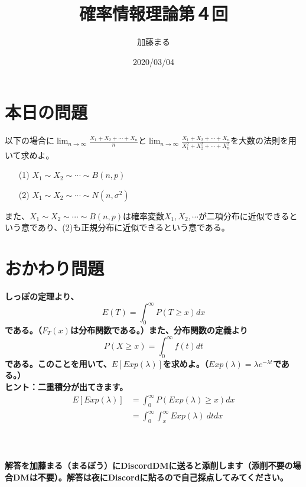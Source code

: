 \documentclass[a4j,uplatex]{jsarticle}
\title{確率情報理論第４回}
\author{加藤まる}
\date{2020/03/04}
\begin{document}
\maketitle

\section*{本日の問題}
以下の場合に$\displaystyle \lim_{n \to \infty} \frac{X_1 + X_2 + \cdots +X_n}{n}$と$\displaystyle \lim_{n \to \infty} \frac{X_1 + X_2 + \cdots +X_n}{X_1^2 + X_2^2 + \cdots +X_n^2}$を大数の法則を用いて求めよ。
\begin{itemize}
  \item[(1)] $X_1\sim X_2\sim \cdots \sim B(n,p)$
  \item[(2)] $X_1\sim X_2\sim \cdots \sim N(n,\sigma ^2)$
\end{itemize}
また、$X_1\sim X_2\sim \cdots \sim B(n,p)$は確率変数$X_1, X_2,\cdots$が二項分布に近似できるという意であり、(2)も正規分布に近似できるという意である。


\section*{おかわり問題}
\bf しっぽの定理\rm より、
\begin{equation}
  E(T)=\int_{0}^{\infty} P(T\ge x)dx
\end{equation}
である。（$F_T (x)$は分布関数である。）また、分布関数の定義より
\begin{equation}
  P(X\ge x) = \int_{0}^{\infty} f(t)dt
\end{equation}
である。このことを用いて、$E[Exp(\lambda)]$を求めよ。（$Exp(\lambda)=\lambda e^{-\lambda t}$である。）
\\
ヒント：二重積分が出てきます。
\begin{equation}
  \begin{split}
    E[Exp(\lambda)] &= \int_{0}^{\infty} P(Exp(\lambda)\ge x)dx \\
    &=\int_{0}^{\infty} \int_{x}^{\infty} Exp(\lambda)~ dt dx
  \end{split}
\end{equation}
\\
\\
\\
解答を加藤まる（まるぼう）にDiscordDMに送ると添削します（添削不要の場合DMは不要）。解答は夜にDiscordに貼るので自己採点してみてください。
\end{document}
